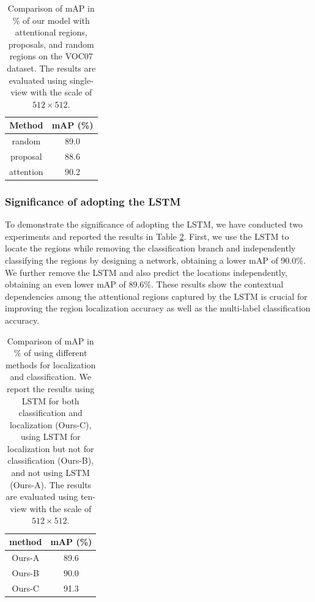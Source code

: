 \documentclass[letterpaper]{article} %
\begin{document}
\begin{table}[htp]
\centering
\begin{tabular}{c|c}
\hline
\centering Method & mAP (\%)  \\
\hline
\hline
\centering random  & 89.0 \\
\centering proposal  & 88.6 \\
\centering attention & 90.2 \\
\hline
\end{tabular}
\caption{Comparison of mAP in \% of our model with attentional regions, proposals, and random regions on the VOC07 dataset. The results are evaluated using single-view with the scale of $512\times 512$.}
\label{table:attention}
\end{table}

\subsubsection{Significance of adopting the LSTM}
To demonstrate the significance of adopting the LSTM, we have conducted two experiments and reported the results in Table \ref{table:lstm}. First, we use the LSTM to locate the regions while removing the classification branch and independently classifying the regions by designing a network, obtaining a lower mAP of 90.0\%. We further remove the LSTM and also predict the locations independently, obtaining an even lower mAP of 89.6\%. These results show the contextual dependencies among the attentional regions captured by the LSTM is crucial for improving the region localization accuracy as well as the multi-label classification accuracy.

\begin{table}[htp]
\centering
\begin{tabular}{c|c}
\hline
\centering method  & mAP (\%) \\
\hline
\hline
\centering Ours-A & 89.6  \\
\centering Ours-B  & 90.0  \\
\centering Ours-C & 91.3 \\
\hline
\end{tabular}
\caption{Comparison of mAP in \% of using different methods for localization and classification. We report the results using LSTM for both classification and localization (Ours-C), using LSTM for localization but not for classification (Ours-B), and not using LSTM (Ours-A). The results are evaluated using ten-view with the scale of $512\times 512$.}
\label{table:lstm}
\end{table}
\end{document}
